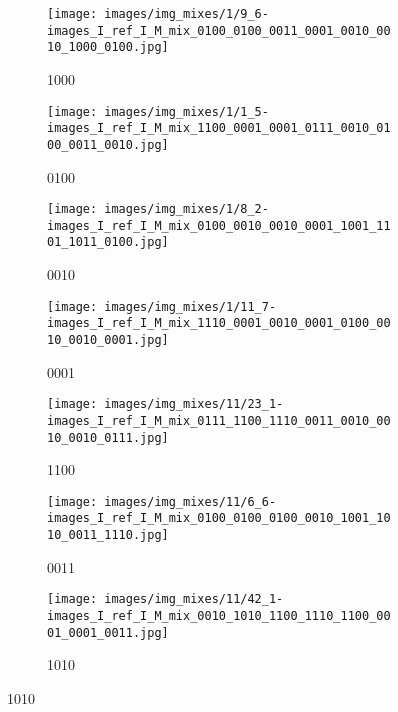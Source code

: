 \documentclass[12pt,a4paper]{article}
\begin{document}
\begin{figure}[h!]
     \centering
     \begin{subfigure}[b]{0.23\textwidth}
         \centering
         \texttt{[image: images/img\_mixes/1/9\_6-images\_I\_ref\_I\_M\_mix\_0100\_0100\_0011\_0001\_0010\_0010\_1000\_0100.jpg]}
         \caption{1000}
         \label{fig:quad_repl_ex_1_1}
     \end{subfigure}  
     \hfill
     \begin{subfigure}[b]{0.23\textwidth}
         \centering
         \texttt{[image: images/img\_mixes/1/1\_5-images\_I\_ref\_I\_M\_mix\_1100\_0001\_0001\_0111\_0010\_0100\_0011\_0010.jpg]}
         \caption{0100}
         \label{fig:quad_repl_ex_1_2}
     \end{subfigure}
     \hfill
     \begin{subfigure}[b]{0.23\textwidth}
         \centering
         \texttt{[image: images/img\_mixes/1/8\_2-images\_I\_ref\_I\_M\_mix\_0100\_0010\_0010\_0001\_1001\_1101\_1011\_0100.jpg]}
         \caption{0010}
         \label{fig:quad_repl_ex_1_3}
     \end{subfigure}
     \hfill
     \begin{subfigure}[b]{0.23\textwidth}
         \centering
         \texttt{[image: images/img\_mixes/1/11\_7-images\_I\_ref\_I\_M\_mix\_1110\_0001\_0010\_0001\_0100\_0010\_0010\_0001.jpg]}
         \caption{0001}
         \label{fig:quad_repl_ex_1_4}
     \end{subfigure}
     \hfill
     \begin{subfigure}[b]{0.23\textwidth}
         \centering
         \texttt{[image: images/img\_mixes/11/23\_1-images\_I\_ref\_I\_M\_mix\_0111\_1100\_1110\_0011\_0010\_0010\_0010\_0111.jpg]}
         \caption{1100}
         \label{fig:quad_repl_ex_2_1}
     \end{subfigure}
     \hfill     
     \begin{subfigure}[b]{0.23\textwidth}
         \centering
         \texttt{[image: images/img\_mixes/11/6\_6-images\_I\_ref\_I\_M\_mix\_0100\_0100\_0100\_0010\_1001\_1010\_0011\_1110.jpg]}
         \caption{0011}
         \label{fig:quad_repl_ex_2_2}
     \end{subfigure}
     \hfill
     \begin{subfigure}[b]{0.23\textwidth}
         \centering
         \texttt{[image: images/img\_mixes/11/42\_1-images\_I\_ref\_I\_M\_mix\_0010\_1010\_1100\_1110\_1100\_0001\_0001\_0011.jpg]}
         \caption{1010}
         \label{fig:quad_repl_ex_2_3}

\end{subfigure}
\end{figure}
\end{document}
